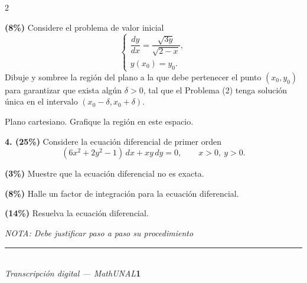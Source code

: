 \documentclass[11pt]{article}
\begin{document}
\begin{multicols}{2}
\begin{opciones}
\columnbreak

\item[d)] \textbf{(8\%)} Considere el problema de valor inicial
\[
\begin{cases}
\dfrac{dy}{dx}=\dfrac{\sqrt{3y}}{\sqrt{2-x}}, \\
y(x_0)=y_0.
\end{cases}
\tag{2}
\]
Dibuje y sombree la región del plano a la que debe pertenecer el punto $(x_0,y_0)$ para garantizar que exista algún $\delta>0$, tal que el Problema (2) tenga solución única en el intervalo $(x_0-\delta,x_0+\delta)$.

\begin{center}

{\scriptsize Plano cartesiano. Grafique la región en este espacio.}
\end{center}
\end{opciones}

\end{multicols}

\newpage

\noindent\textbf{4. (25\%)} Considere la ecuación diferencial de primer orden
\[
(6x^2+2y^2-1)\,dx+xy\,dy=0, \qquad x>0,\ y>0.
\]

\begin{opciones}
\item[a.] \textbf{(3\%)} Muestre que la ecuación diferencial no es exacta.
\item[b.] \textbf{(8\%)} Halle un factor de integración para la ecuación diferencial.
\item[c.] \textbf{(14\%)} Resuelva la ecuación diferencial.
\end{opciones}

\noindent\textit{NOTA: Debe justificar paso a paso su procedimiento}

\vspace{9cm}

\vfill
\rule{\linewidth}{0.4pt}\\[1pt]
{\scriptsize\textit{Transcripción digital --- MathUNAL}\hfill\textcolor{unalblue}{\textbf{1}}}
\end{document}
